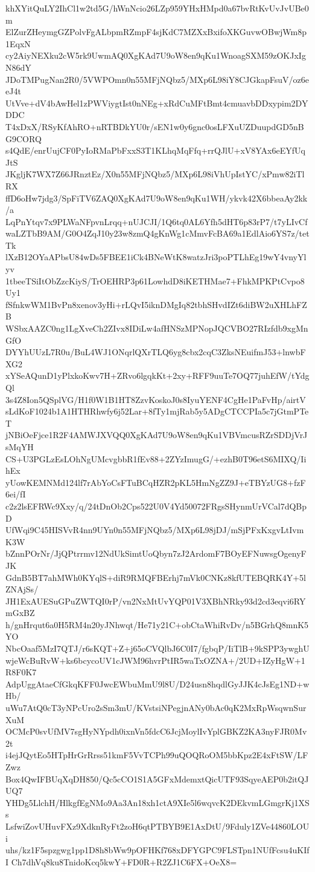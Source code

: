 khXYitQuLY2IhCl1w2td5G/hWnNcio26LZp959YHxHMpd0a67bvRtKvUvJvUBe0m
ElZurZHeymgGZPolvFgALbpmRZmpF4sjKdC7MZXxBxifoXKGuvwOBwjWm8p1EqxN
cy2AiyNEXku2cW5rk9UwmAQ0XgKAd7U9oW8en9qKu1WnoagSXM59zOKJxIgN86dY
JDoTMPugNan2R0/5VWPOmn0n55MFjNQbz5/MXp6L98iY8CJGkapFsuV/oz6eeJ4t
UtVve+dV4bAwHel1zPWViygtIst0nNEg+xRdCuMFtBmt4cmuavbDDxypim2DYDDC
T4xDxX/RSyKfAhRO+nRTBDkYU0r/sEN1w0y6gnc0osLFXuUZDuupdGD5nBG9CORQ
s4QdE/enrUujCF0PyIoRMaPbFxxS3T1KLhqMqFfq+rrQJlU+xV8YAx6eEYfUqJtS
JKgljK7WX7Z66JRnztEz/X0n55MFjNQbz5/MXp6L98iVhUpIstYC/xPmw82iTlRX
ffD6oHw7jdg3/SpFiTV6ZAQ0XgKAd7U9oW8en9qKu1WH/ykvk42X6bbeaAy2kk/a
LqPnYtqv7x9PLWaNFpvnLrqq+nUJCJI/1Q6tq0AL6Yfh5dHT6p83rP7/t7yLIvCf
waLZTbB9AM/G0O4ZqJ10y23w8zmQ4gKnWg1cMmvFcBA69a1EdlAio6YS7z/tetTk
lXzB12OYaAPbsU84wDs5FBEE1iCk4BNeWtK8watzJri3poPTLhEg19wY4vnyYlyv
1tbeeTSiItObZzcKiyS/TrOEHRP3p61LowhdD8iKETHMae7+FhkMPKPtCvpo8Uy1
fSfnkwWM1BvPn8xenov3yHi+rLQvI5iknDMgIq82tbhSHvdIZt6diBW2uXHLhFZB
WSbxAAZC0ng1LgXveCh2ZIvx8IDiLw4afHNSzMPNopJQCVBO27RIzfdb9xgMnGfO
DYYhUUzL7R0u/BuL4WJ1ONqrlQXrTLQ6yg8cbx2cqC3ZksNEuifmJ53+lnwbFXG2
xYSeAQunD1yPlxkoKwv7H+ZRvo6lgqkKt+2xy+RFF9uuTe7OQ77juhEfW/tYdgQl
3s4Z8Ion5QSplVG/H1f0W1B1HT8ZzvKoskoJ0s8IyuYENF4CgHe1PaFvHp/airtV
sLdKoF1024b1A1HTHRhwfy6j52Lar+8fTy1mjRab5y5ADgCTCCPIa5c7jGtmPTeT
jNBiOeFjce1R2F4AMWJXVQQ0XgKAd7U9oW8en9qKu1VBVmcusRZrSDDjVrJsMqYH
CS+U3PGLzEsLOhNgUMcvgbbR1fEv88+2ZYzImugG/+ezhB0T96etS6MIXQ/IihEx
yUowKEMNMd124lf7rAbYoCsFTuBCqHZR2pKL5HmNgZZ9J+eTBYzUG8+fzF6ei/fI
c2z2lsEFRWc9Xxy/q/24tDnOb2Cps522U0V4Yd50072FRgsSHynmUrVCal7dQBpD
UfWqi9C45HISVvR4nn9UYn0n55MFjNQbz5/MXp6L98jDJ/mSjPFxKxgvLtIvmK3W
bZnnPOrNr/JjQPtrrmv12NdUkSimtUoQbyn7zJ2ArdomF7BOyEFNuwsgOgenyFJK
GdnB5BT7ahMWh0KYqlS+diR9RMQFBErhj7mVk0CNKz8kfUTEBQRK4Y+5lZNAjSs/
JH1ExAUESuGPuZWTQI0rP/vn2NxMtUvYQP01V3XBhNRky93d2cd3eqvi6RYmGxBZ
h/gnHrqut6a0H5RM4n20yJNhwqt/He71y21C+obCtaWhiRvDv/n5BGrhQ8mnK5YO
NbcOaaf5MzI7QTJ/r6sKQT+Z+j65oCVQlbJ6C0I7/fgbqP/IiTlB+9kSPP3ywghU
wjeWcBuRvW+ks6bcycoUV1cJWM96hvrPtIR5waTxOZNA+/2UD+IZyHgW+1R8F0K7
AdpUggAtaeCfGkqKFF0JwcEWbuMmU9l8U/D24usn8hqdlGyJJK4cJsEg1ND+wHb/
uWu7AtQ0cT3yNPcUro2sSm3mU/KVstsiNPegjnANy0bAc0qK2MxRpWsqwnSurXuM
OCMcP0svUfMV7sgHyNYpdh0ixnVn5fdcC6JcjMoylIvYplGBKZ2KA3nyFJR0Mv2t
i4ejJQytEo5HTpHrGrRrss51kmF5VvTCPh99uQOQRoOM5bbKpz2E4xFtSW/LFZwz
Box4QwIFBUqXqDH850/Qc5cCO1S1A5GFxMdemxtQicUTF93SqyeAEP0b2itQJUQ7
YHDg5LlchH/HlkgfEgNMo9Aa3An18xh1ctA9XIe5l6wqvcK2DEkvmLGmgrKj1XSs
LsfwiZovUHuvFXz9XdknRyFt2zoH6qtPTBYB9E1AxDtU/9Fduly1ZVe44860LOUi
uhs/kz1F5spzgwg1pp1D8h8bWw9pOFHKf768xDFYGPC9FLSTpn1NUfFcsu4uKIfI
Ch7dhVq8ku8TnidoKcq5kwY+FD0R+R2ZJ1C6FX+OeX8=
